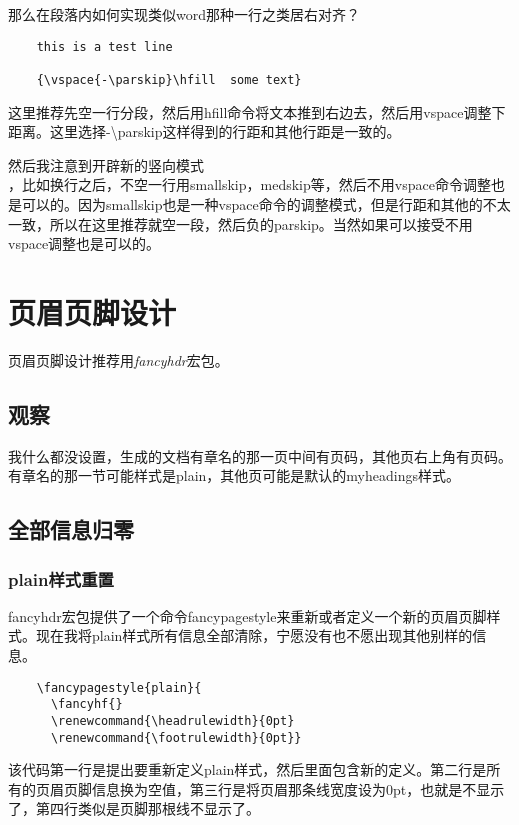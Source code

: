 \documentclass[11pt,oneside]{book}
\begin{document}
  那么在段落内如何实现类似word那种一行之类居右对齐？

  \begin{Verbatim}
    this is a test line

    {\vspace{-\parskip}\hfill  some text}
  \end{Verbatim}

  这里推荐先空一行分段，然后用hfill命令将文本推到右边去，然后用vspace调整下距离。这里选择-\textbackslash parskip这样得到的行距和其他行距是一致的。

  {\vspace{-\parskip}\hfill  然后我注意到开辟新的竖向模式}\\，比如换行之后，不空一行用smallskip，medskip等，然后不用vspace命令调整也是可以的。因为smallskip也是一种vspace命令的调整模式，但是行距和其他的不太一致，所以在这里推荐就空一段，然后负的parskip。当然如果可以接受不用vspace调整也是可以的。



  \chapter{页眉页脚设计}
  页眉页脚设计推荐用\emph{fancyhdr}宏包。
  \section{观察}
  我什么都没设置，生成的文档有章名的那一页中间有页码，其他页右上角有页码。有章名的那一节可能样式是plain，其他页可能是默认的myheadings样式。

  \section{全部信息归零}
  \subsection{plain样式重置}
  fancyhdr宏包提供了一个命令fancypagestyle来重新或者定义一个新的页眉页脚样式。现在我将plain样式所有信息全部清除，宁愿没有也不愿出现其他别样的信息。
  \begin{Verbatim}
    \fancypagestyle{plain}{
      \fancyhf{}
      \renewcommand{\headrulewidth}{0pt}
      \renewcommand{\footrulewidth}{0pt}}
  \end{Verbatim}
  该代码第一行是提出要重新定义plain样式，然后里面包含新的定义。第二行是所有的页眉页脚信息换为空值，第三行是将页眉那条线宽度设为0pt，也就是不显示了，第四行类似是页脚那根线不显示了。
\end{document}
